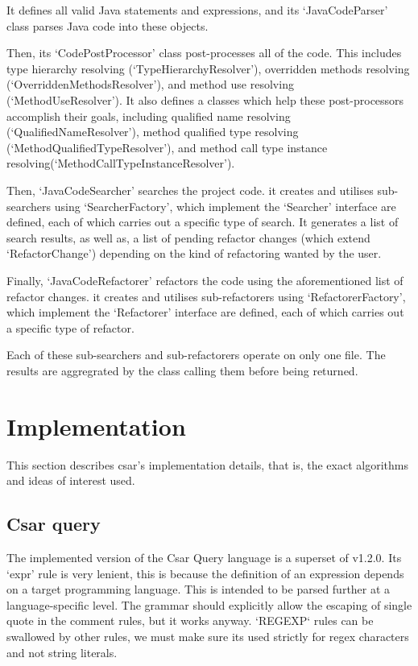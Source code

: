 \documentclass[12pt, letterpaper]{article}
\begin{document}
It defines all valid Java statements and expressions, and its `JavaCodeParser' class parses Java code into these objects.

Then, its `CodePostProcessor' class post-processes all of the code.
This includes type hierarchy resolving (`TypeHierarchyResolver'), overridden methods resolving (`OverriddenMethodsResolver'), and method use resolving (`MethodUseResolver').
It also defines a classes which help these post-processors accomplish their goals, including qualified name resolving (`QualifiedNameResolver'), method qualified type resolving (`MethodQualifiedTypeResolver'), and method call type instance resolving(`MethodCallTypeInstanceResolver').

Then, `JavaCodeSearcher' searches the project code.
it creates and utilises sub-searchers using `SearcherFactory', which implement the `Searcher' interface are defined, each of which carries out a specific type of search.
It generates a list of search results, as well as, a list of pending refactor changes (which extend `RefactorChange') depending on the kind of refactoring wanted by the user.

Finally, `JavaCodeRefactorer' refactors the code using the aforementioned list of refactor changes.
it creates and utilises sub-refactorers using `RefactorerFactory', which implement the `Refactorer' interface are defined, each of which carries out a specific type of refactor.

Each of these sub-searchers and sub-refactorers operate on only one file.
The results are aggregrated by the class calling them before being returned.

\section{Implementation}
This section describes csar's implementation details, that is, the exact algorithms and ideas of interest used.

\subsection{Csar query}
The implemented version of the Csar Query language is a superset of v1.2.0.
Its `expr' rule is very lenient, this is because the definition of an expression depends on a target programming language. 
This is intended to be parsed further at a language-specific level.
The grammar should explicitly allow the escaping of single quote in the comment rules, but it works anyway.
`REGEXP` rules can be swallowed by other rules, we must make sure its used strictly for regex characters and not string literals.
\end{document}
